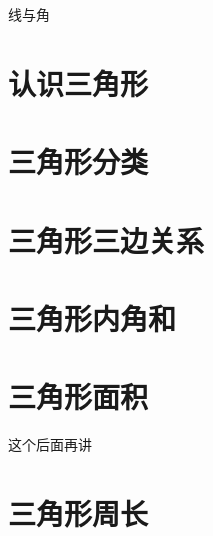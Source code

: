 \setcounter{section}{0}


\begin{parchmentquote}
    线与角
\end{parchmentquote}






\section{认识三角形}
\section{三角形分类}
\section{三角形三边关系}
\section{三角形内角和}
\section{三角形面积}
这个后面再讲
\section{三角形周长}



\newpage